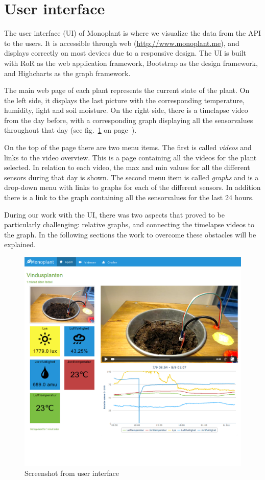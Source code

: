 \section{User interface}
The user interface (UI) of Monoplant is where we visualize the data from the API to the users. It is accessible through web (\url{http://www.monoplant.me}), and displays correctly on most devices due to a responsive design. The UI is built with RoR as the web application framework, Bootstrap as the design framework, and Highcharts as the graph framework.   

The main web page of each plant represents the current state of the plant. On the left side, it displays the last picture with the corresponding temperature, humidity, light and soil moisture. On the right side, there is a timelapse video from the day before, with a corresponding graph displaying all the sensorvalues throughout that day (see fig.~\ref{fig:mainpage} on page~\pageref{fig:mainpage}). 

On the top of the page there are two menu items. The first  is called \emph{videos} and links to the video overview. This is a page containing all the videos for the plant selected. In relation to each video, the max and min values for all the different sensors during that day is shown. The second menu item is called \emph{graphs} and is a drop-down menu with links to graphs for each of the different sensors. In addition there is a link to the graph containing all the sensorvalues for the last 24 hours. 

During our work with the UI, there was two aspects that proved to be particularly challenging: relative graphs, and connecting the timelapse videos to the graph. In the following sections the work to overcome these obstacles will be explained. 

\begin{figure}
\centering
\includegraphics[width=1\textwidth]{img/interface/mainpage.png}
\caption{Screenshot from user interface}
\label{fig:mainpage}
\end{figure}

